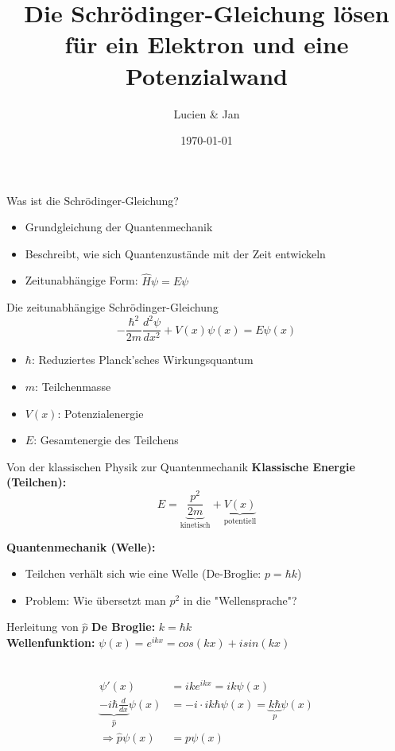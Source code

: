 \documentclass{beamer}
\title{Die Schrödinger-Gleichung lösen für ein Elektron und eine Potenzialwand}
\author{Lucien \& Jan}
\date{\today}
\begin{document}
    \begin{frame}
        \titlepage
    \end{frame}

    \begin{frame}{Was ist die Schrödinger-Gleichung?}
        \begin{itemize}
            \item Grundgleichung der Quantenmechanik
            \item Beschreibt, wie sich Quantenzustände mit der Zeit entwickeln
            \item Zeitunabhängige Form: $\hat{H}\psi = E\psi$
        \end{itemize}
    \end{frame}

    \begin{frame}{Die zeitunabhängige Schrödinger-Gleichung}
        \[
            -\frac{\hbar^2}{2m}\frac{d^2\psi}{dx^2} + V(x)\psi(x) = E\psi(x)
        \]
        \begin{itemize}
            \item $\hbar$: Reduziertes Planck'sches Wirkungsquantum
            \item $m$: Teilchenmasse
            \item $V(x)$: Potenzialenergie
            \item $E$: Gesamtenergie des Teilchens
        \end{itemize}
    \end{frame}


    \begin{frame}{Von der klassischen Physik zur Quantenmechanik}
        \textbf{Klassische Energie (Teilchen):}
        \[
            E = \underbrace{\frac{p^2}{2m}}_{\text{kinetisch}} + \underbrace{V(x)}_{\text{potentiell}}
        \]

        \textbf{Quantenmechanik (Welle):}
        \begin{itemize}
            \item Teilchen verhält sich wie eine Welle (De-Broglie: $p = \hbar k$)
            \item \alert{Problem:} Wie übersetzt man $p^2$ in die "Wellensprache"?
        \end{itemize}
    \end{frame}

    \begin{frame}{Herleitung von $\hat{p}$}
        \textbf{De Broglie: } $k=\hbar k$\\
        \textbf{Wellenfunktion: } $\psi (x)=e^{ikx}=cos(kx)+i sin(kx)$\\\

        \begin{align*}
            \psi '(x)&=ike^{ikx}=ik\psi(x)\\
            \underbrace{-i\hbar\frac{d}{dx}}_{\hat{p}}\psi (x) &=-i \cdot i k\hbar\psi(x)=\underbrace{k\hbar}_{p}\psi(x)\\
            \Rightarrow \hat{p}\psi(x)&=p\psi(x)
        \end{align*}
    \end{frame}
\end{document}
